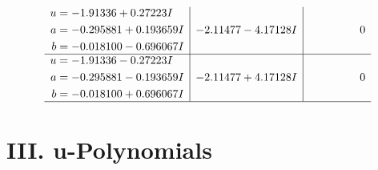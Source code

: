 \documentclass[1p]{elsarticle_modified}
\theoremstyle{definition}
\begin{document}
$$\begin{array}{c|c|c}
\begin{aligned}
u &= -1.91336 + 0.27223 I \\
a &= -0.295881 + 0.193659 I \\
b &= -0.018100 - 0.696067 I\end{aligned}
 & -2.11477 - 4.17128 I & \phantom{-0.000000 } 0 \\ \hline\begin{aligned}
u &= -1.91336 - 0.27223 I \\
a &= -0.295881 - 0.193659 I \\
b &= -0.018100 + 0.696067 I\end{aligned}
 & -2.11477 + 4.17128 I & \phantom{-0.000000 } 0\\
 \hline 
 \end{array}$$\newpage
\newpage\renewcommand{\arraystretch}{1}
\centering \section*{ III. u-Polynomials}
\end{document}
